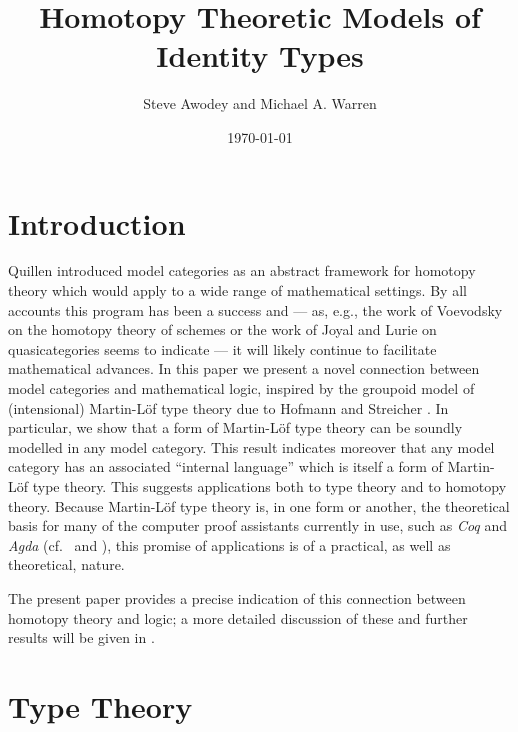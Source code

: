 \documentclass{amsart}
\theoremstyle{definition}
\theoremstyle{remark}
\begin{document}
\author{Steve Awodey and Michael A. Warren}
\date{\today}
\address{Department of Philosophy\\Carnegie Mellon
  University\\Pittsburgh, PA\\USA 15213}

\title[identity types]{Homotopy Theoretic Models of Identity Types}
\maketitle
\section{Introduction}

\noindent Quillen \cite{Quillen:HA} introduced model categories as an
abstract framework for homotopy theory which would apply to a wide
range of mathematical settings.  By all accounts this program has been
a success and ---  as, e.g., the work of Voevodsky on the homotopy theory of
schemes \cite{Morel:A1HTS} or the work of Joyal
\cite{Joyal:QCKC,Joyal:NOQC} and Lurie \cite{Lurie:HTT} on
quasicategories seems to indicate --- it will likely continue to
facilitate mathematical advances.  In this paper we present a
novel connection between model categories and mathematical logic, inspired by
the groupoid model of (intensional) Martin-L\"{o}f type theory
\cite{MartinLof:ITT} due to Hofmann and Streicher \cite{Hofmann:GITT}.  In
particular, we show that a form of Martin-L\"{o}f type
theory can be soundly modelled in any model
category.  This result indicates moreover that any model category
has an associated ``internal language'' which is itself a form of
Martin-L\"{o}f type theory.  This suggests applications both to
type theory and to homotopy theory.  Because Martin-L\"{o}f type
theory is, in one form or another, the theoretical basis for many of
the computer proof assistants currently in use, such as \emph{Coq} and
\emph{Agda} (cf.~\cite{Bertot:ITPPD} and \cite{Coquand:STT}),
this promise of applications is of a practical, as well as theoretical, nature.

The present paper provides a precise indication of this connection
between homotopy theory and logic; a more detailed discussion
of these and further results will be given in \cite{Warren:PhD}.

\section{Type Theory}\label{section:type_theory}
\end{document}
